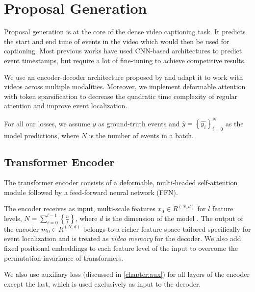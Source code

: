 \section{Proposal Generation}
\par Proposal generation is at the core of the dense video captioning task. It predicts the start and end time of events in the video which would then be used for captioning. Most previous works have used CNN-based architectures to predict event timestamps, but require a lot of fine-tuning to achieve competitive results.
\par We use an encoder-decoder architecture proposed by \cite{carion2020detr} and adapt it to work with videos across multiple modalities. Moreover, we implement deformable  attention \cite{zhu2020deformable} with token sparsification \cite{roh2021sparse} to decrease the quadratic time complexity of regular attention and improve event localization.
\par For all our losses, we assume $y$ as ground-truth events and $\hat{y}=\left \{ \hat{y_{i}} \right \}_{i=0}^{N}$ as the model predictions, where $N$ is the number of events in a batch.

\subsection{Transformer Encoder}
\par The transformer encoder consists of a deformable, multi-headed self-attention module followed by a feed-forward neural network (FFN). 
\par The encoder receives as input, multi-scale features $x_{0} \in R^{(N , d)}$ for $l$ feature levels, $N = \sum_{i=0}^{l-1}\left \{\frac{n}{i} \right \}$, where $d$ is the dimension of the model . The output of the encoder $m_{0} \in R^{(N , d)}$ belongs to a richer feature space tailored specifically for event localization and is treated as \textit{video memory} for the decoder. We also add fixed positional embeddings to each feature level of the input to overcome the permutation-invariance of transformers. 
\par We also use auxiliary loss (discussed in \ref{chapter:aux}) for all layers of the encoder except the last, which is used exclusively as input to the decoder.

